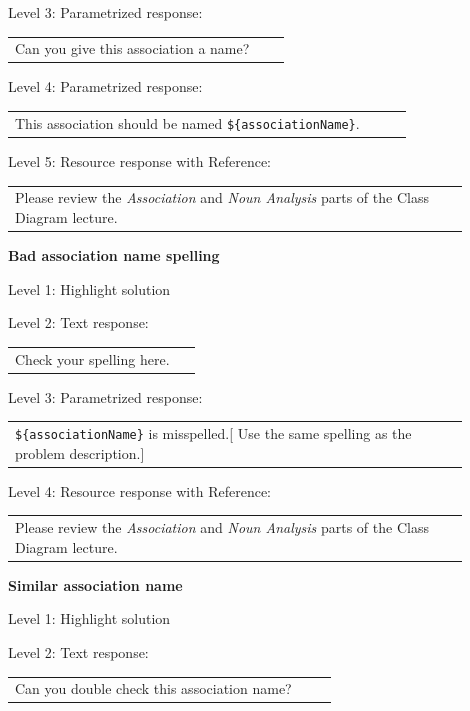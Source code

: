 \noindent Level 3: Parametrized response: \medskip

\begin{tabular}{|p{0.9\linewidth}}
Can you give this association a name?
\end{tabular} \medskip

\noindent Level 4: Parametrized response: \medskip

\begin{tabular}{|p{0.9\linewidth}}
This association should be named \verb|${associationName}|.
\end{tabular} \medskip

\noindent Level 5: Resource response with Reference: \medskip

\begin{tabular}{|p{0.9\linewidth}}
Please review the \textit{Association} and \textit{Noun Analysis} parts of the Class Diagram lecture.
\end{tabular} \medskip


\noindent \textbf{Bad association name spelling} \medskip

\noindent Level 1: Highlight solution \medskip

\noindent Level 2: Text response: \medskip

\begin{tabular}{|p{0.9\linewidth}}
Check your spelling here.
\end{tabular} \medskip

\noindent Level 3: Parametrized response: \medskip

\begin{tabular}{|p{0.9\linewidth}}
\verb|${associationName}| is misspelled.[ Use the same spelling as the problem description.]
\end{tabular} \medskip

\noindent Level 4: Resource response with Reference: \medskip

\begin{tabular}{|p{0.9\linewidth}}
Please review the \textit{Association} and \textit{Noun Analysis} parts of the Class Diagram lecture.
\end{tabular} \medskip


\noindent \textbf{Similar association name} \medskip

\noindent Level 1: Highlight solution \medskip

\noindent Level 2: Text response: \medskip

\begin{tabular}{|p{0.9\linewidth}}
Can you double check this association name?
\end{tabular} \medskip

